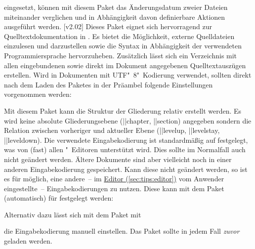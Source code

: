 \begin{DeclarePackages}
  eingesetzt, können mit diesem Paket das Änderungsdatum zweier Dateien 
  miteinander verglichen und in Abhängigkeit davon definierbare Aktionen 
  ausgeführt werden.
[v2.02]
  Dieses Paket eignet sich hervorragend zur Quelltextdokumentation in 
  . Es bietet die Möglichkeit, externe Quelldateien einzulesen 
  und darzustellen sowie die Syntax in Abhängigkeit der verwendeten 
  Programmiersprache hervorzuheben. Zusätzlich lässt sich ein Verzeichnis mit 
  allen eingebundenen sowie direkt im Dokument angegebenen Quelltextauszügen 
  erstellen. Wird  in Dokumenten mit UTF"~8"~Kodierung 
  verwendet, sollten direkt nach dem Laden des Paketes in der Präambel folgende 
  Einstellungen vorgenommen werden:
  \begin{Code}
  \end{Code}\vspace{-\baselineskip}%
  Mit diesem Paket kann die Struktur der Gliederung relativ erstellt werden. Es 
  wird keine absolute Gliederungsebene (\Macro||{chapter}, \Macro||{section}) 
  angegeben sondern die Relation zwischen vorheriger und aktueller Ebene 
  (\Macro||{levelup}, \Macro||{levelstay}, \Macro||{leveldown}).
  Die verwendete Eingabekodierung ist standardmäßig auf 
  festgelegt, was von (fast) allen "~Editoren unterstützt wird. 
  Dies sollte im Normalfall auch nicht geändert werden. Ältere Dokumente sind 
  aber vielleicht noch in einer anderen Eingabekodierung gespeichert. Kann 
  diese nicht geändert werden, so ist es für  möglich, eine 
  andere~-- im \hyperref[sec:tips:editor]{Editor (\autoref*{sec:tips:editor})} 
  vom Anwender eingestellte~-- Eingabekodierungen zu nutzen. Diese kann mit dem 
  Paket  (automatisch) für  festgelegt werden:
  \begin{Code}
    \usepackage{selinput}
  \end{Code}\vspace{-\baselineskip}%
  Alternativ dazu lässt sich mit dem Paket  mit
  \vspace{-\baselineskip}%
  die Eingabekodierung manuell einstellen. Das Paket  sollte 
  in jedem Fall \emph{zuvor} geladen werden.
\end{DeclarePackages}



